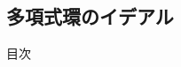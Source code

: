 \documentclass[aspectratio=169, dvipdfmx, 11pt]{beamer} %
\begin{document}
%

\subsection{多項式環のイデアル}
\begin{frame}{目次}
	\tableofcontents[currentsubsection]
\end{frame}



\end{document}
